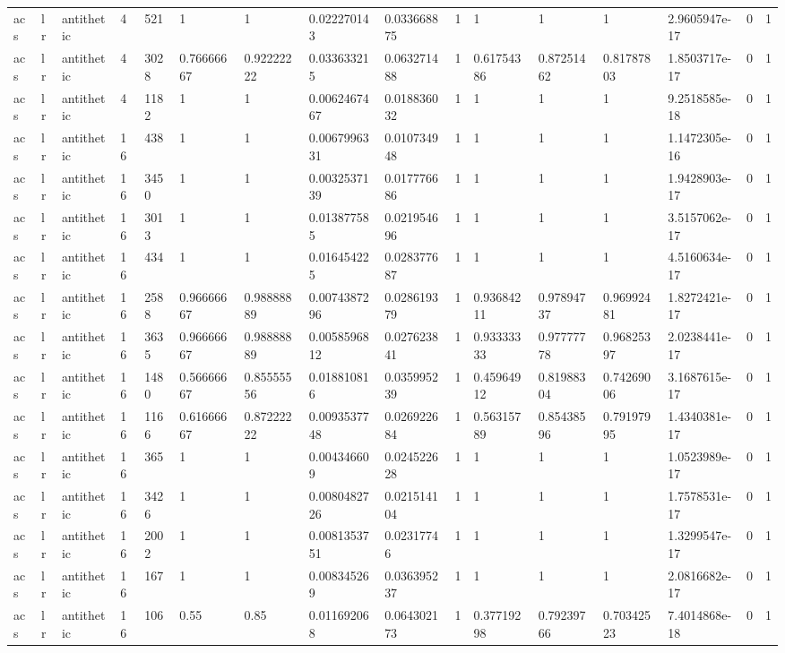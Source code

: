 \begin{tabular}{llllllllllllllll}
acs & lr & antithetic & 4 & 521 & 1 & 1 & 0.022270143 & 0.033668875 & 1 & 1 & 1 & 1 & 2.9605947e-17 & 0 & 1 \\
acs & lr & antithetic & 4 & 3028 & 0.76666667 & 0.92222222 & 0.033633215 & 0.063271488 & 1 & 0.61754386 & 0.87251462 & 0.81787803 & 1.8503717e-17 & 0 & 1 \\
acs & lr & antithetic & 4 & 1182 & 1 & 1 & 0.0062467467 & 0.018836032 & 1 & 1 & 1 & 1 & 9.2518585e-18 & 0 & 1 \\
acs & lr & antithetic & 16 & 438 & 1 & 1 & 0.0067996331 & 0.010734948 & 1 & 1 & 1 & 1 & 1.1472305e-16 & 0 & 1 \\
acs & lr & antithetic & 16 & 3450 & 1 & 1 & 0.0032537139 & 0.017776686 & 1 & 1 & 1 & 1 & 1.9428903e-17 & 0 & 1 \\
acs & lr & antithetic & 16 & 3013 & 1 & 1 & 0.013877585 & 0.021954696 & 1 & 1 & 1 & 1 & 3.5157062e-17 & 0 & 1 \\
acs & lr & antithetic & 16 & 434 & 1 & 1 & 0.016454225 & 0.028377687 & 1 & 1 & 1 & 1 & 4.5160634e-17 & 0 & 1 \\
acs & lr & antithetic & 16 & 2588 & 0.96666667 & 0.98888889 & 0.0074387296 & 0.028619379 & 1 & 0.93684211 & 0.97894737 & 0.96992481 & 1.8272421e-17 & 0 & 1 \\
acs & lr & antithetic & 16 & 3635 & 0.96666667 & 0.98888889 & 0.0058596812 & 0.027623841 & 1 & 0.93333333 & 0.97777778 & 0.96825397 & 2.0238441e-17 & 0 & 1 \\
acs & lr & antithetic & 16 & 1480 & 0.56666667 & 0.85555556 & 0.018810816 & 0.035995239 & 1 & 0.45964912 & 0.81988304 & 0.74269006 & 3.1687615e-17 & 0 & 1 \\
acs & lr & antithetic & 16 & 1166 & 0.61666667 & 0.87222222 & 0.0093537748 & 0.026922684 & 1 & 0.56315789 & 0.85438596 & 0.79197995 & 1.4340381e-17 & 0 & 1 \\
acs & lr & antithetic & 16 & 365 & 1 & 1 & 0.004346609 & 0.024522628 & 1 & 1 & 1 & 1 & 1.0523989e-17 & 0 & 1 \\
acs & lr & antithetic & 16 & 3426 & 1 & 1 & 0.0080482726 & 0.021514104 & 1 & 1 & 1 & 1 & 1.7578531e-17 & 0 & 1 \\
acs & lr & antithetic & 16 & 2002 & 1 & 1 & 0.0081353751 & 0.02317746 & 1 & 1 & 1 & 1 & 1.3299547e-17 & 0 & 1 \\
acs & lr & antithetic & 16 & 167 & 1 & 1 & 0.008345269 & 0.036395237 & 1 & 1 & 1 & 1 & 2.0816682e-17 & 0 & 1 \\
acs & lr & antithetic & 16 & 106 & 0.55 & 0.85 & 0.011692068 & 0.064302173 & 1 & 0.37719298 & 0.79239766 & 0.70342523 & 7.4014868e-18 & 0 & 1 \\

\end{tabular}
